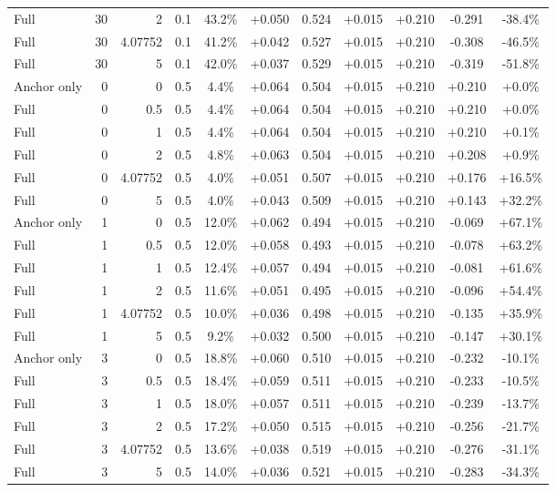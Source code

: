 \begin{table}[htbp]
\begin{tabular}{lrrrccccccc}
Full & 30 & 2 & 0.1 & 43.2\% & +0.050 & 0.524 & +0.015 & +0.210 & -0.291 & -38.4\% \\
Full & 30 & 4.07752 & 0.1 & 41.2\% & +0.042 & 0.527 & +0.015 & +0.210 & -0.308 & -46.5\% \\
Full & 30 & 5 & 0.1 & 42.0\% & +0.037 & 0.529 & +0.015 & +0.210 & -0.319 & -51.8\% \\
Anchor only & 0 & 0 & 0.5 & 4.4\% & +0.064 & 0.504 & +0.015 & +0.210 & +0.210 & +0.0\% \\
Full & 0 & 0.5 & 0.5 & 4.4\% & +0.064 & 0.504 & +0.015 & +0.210 & +0.210 & +0.0\% \\
Full & 0 & 1 & 0.5 & 4.4\% & +0.064 & 0.504 & +0.015 & +0.210 & +0.210 & +0.1\% \\
Full & 0 & 2 & 0.5 & 4.8\% & +0.063 & 0.504 & +0.015 & +0.210 & +0.208 & +0.9\% \\
Full & 0 & 4.07752 & 0.5 & 4.0\% & +0.051 & 0.507 & +0.015 & +0.210 & +0.176 & +16.5\% \\
Full & 0 & 5 & 0.5 & 4.0\% & +0.043 & 0.509 & +0.015 & +0.210 & +0.143 & +32.2\% \\
Anchor only & 1 & 0 & 0.5 & 12.0\% & +0.062 & 0.494 & +0.015 & +0.210 & -0.069 & +67.1\% \\
Full & 1 & 0.5 & 0.5 & 12.0\% & +0.058 & 0.493 & +0.015 & +0.210 & -0.078 & +63.2\% \\
Full & 1 & 1 & 0.5 & 12.4\% & +0.057 & 0.494 & +0.015 & +0.210 & -0.081 & +61.6\% \\
Full & 1 & 2 & 0.5 & 11.6\% & +0.051 & 0.495 & +0.015 & +0.210 & -0.096 & +54.4\% \\
Full & 1 & 4.07752 & 0.5 & 10.0\% & +0.036 & 0.498 & +0.015 & +0.210 & -0.135 & +35.9\% \\
Full & 1 & 5 & 0.5 & 9.2\% & +0.032 & 0.500 & +0.015 & +0.210 & -0.147 & +30.1\% \\
Anchor only & 3 & 0 & 0.5 & 18.8\% & +0.060 & 0.510 & +0.015 & +0.210 & -0.232 & -10.1\% \\
Full & 3 & 0.5 & 0.5 & 18.4\% & +0.059 & 0.511 & +0.015 & +0.210 & -0.233 & -10.5\% \\
Full & 3 & 1 & 0.5 & 18.0\% & +0.057 & 0.511 & +0.015 & +0.210 & -0.239 & -13.7\% \\
Full & 3 & 2 & 0.5 & 17.2\% & +0.050 & 0.515 & +0.015 & +0.210 & -0.256 & -21.7\% \\
Full & 3 & 4.07752 & 0.5 & 13.6\% & +0.038 & 0.519 & +0.015 & +0.210 & -0.276 & -31.1\% \\
Full & 3 & 5 & 0.5 & 14.0\% & +0.036 & 0.521 & +0.015 & +0.210 & -0.283 & -34.3\% \\

\end{tabular}
\end{table}
